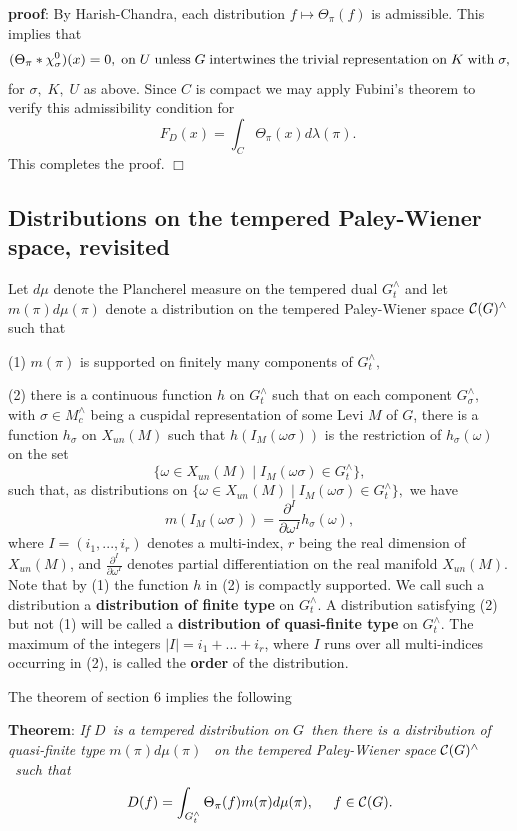 {\bf proof}: By Harish-Chandra, each distribution $f\longmapsto \Theta _\pi
(f)$ is admissible. This implies that 
\[
(\Theta _\pi *\chi _\sigma ^0)(x)=0,\;{\rm on}\;U\;{\rm unless\;}G\;{\rm %
intertwines\;the\;trivial\;representation\;on\;}K\;{\rm with}\;\sigma , 
\]
for $\sigma ,\;K,\;U$ as above. Since $C$ is compact we may apply Fubini's
theorem to verify this admissibility condition for 
\[
F_D(x)=\int_C\Theta _\pi (x)d\lambda (\pi ).\; 
\]
This completes the proof. $\Box $

\subsection{Distributions on the tempered Paley-Wiener space, revisited}

Let $d\mu $ denote the Plancherel measure on the tempered dual $G_t^{\wedge
} $ and let $m(\pi )d\mu (\pi )$ denote a distribution on the tempered
Paley-Wiener space ${\cal C}(G)^{\wedge }$ such that

(1) $m(\pi )$ is supported on finitely many components of $G_t^{\wedge },$

(2) there is a continuous function $h$ on $G_t^{\wedge }$ such that on each
component $G_\sigma ^{\wedge },$ with $\sigma \in M_c^{\wedge }$ being a
cuspidal representation of some Levi $M$ of $G$, there is a function $%
h_\sigma $ on $X_{un}(M)$ such that $h(I_M(\omega \sigma ))$ is the
restriction of $h_\sigma (\omega )$ on the set 
\[
\{\omega \in X_{un}(M)\;|\;I_M(\omega \sigma )\in G_t^{\wedge }\}, 
\]
such that, as distributions on $\{\omega \in X_{un}(M)\;|\;I_M(\omega \sigma
)\in G_t^{\wedge }\},$ we have 
\[
m(I_M(\omega \sigma ))=\frac{\partial ^I}{\partial \omega ^I}h_\sigma
(\omega ), 
\]
where $I=(i_1,...,i_r)$ denotes a multi-index, $r$ being the real dimension
of $X_{un}(M)$, and $\frac{\partial ^I}{\partial \omega ^I}$ denotes partial
differentiation on the real manifold $X_{un}(M).$ Note that by (1) the
function $h$ in (2) is compactly supported. We call such a distribution a 
{\bf distribution of finite type} on $G_t^{\wedge }.$ A distribution
satisfying (2) but not (1) will be called a {\bf distribution of
quasi-finite type }on $G_t^{\wedge }.$ The maximum of the integers $%
|I|=i_1+...+i_r$, where $I$ runs over all multi-indices occurring in (2), is
called the {\bf order} of the distribution.

The theorem of section 6 implies the following

{\bf Theorem}: {\em If }$D${\em \ is a tempered distribution on }$G${\em \
then there is a distribution of quasi-finite type }$m(\pi )d\mu (\pi )${\em %
\ on the tempered Paley-Wiener space }${\cal C}(G)^{\wedge }${\em \ such that%
} 
\[
D(f)=\int_{G_t^{\wedge }}\Theta _\pi (f)m(\pi )d\mu (\pi ),\;\;\;\;\;f\in 
{\cal C}(G). 
\]

